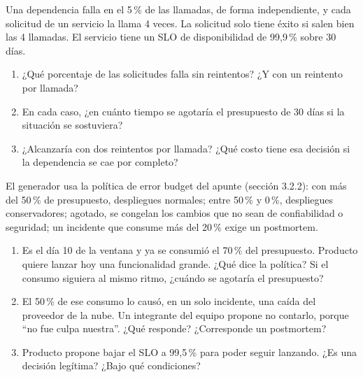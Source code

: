 \documentclass[variant=guia,cover=institutional,mode=screen]{ua-engineering-v6-article}
\begin{document}
\begin{uaexercise}
Una dependencia falla en el 5\,\% de las llamadas, de forma independiente, y cada solicitud de un servicio la llama 4 veces. La solicitud solo tiene éxito si salen bien las 4 llamadas. El servicio tiene un SLO de disponibilidad de 99,9\,\% sobre 30 días.
\begin{enumerate}
\item ¿Qué porcentaje de las solicitudes falla sin reintentos? ¿Y con un reintento por llamada?
\item En cada caso, ¿en cuánto tiempo se agotaría el presupuesto de 30 días si la situación se sostuviera?
\item ¿Alcanzaría con dos reintentos por llamada? ¿Qué costo tiene esa decisión si la dependencia se cae por completo?
\end{enumerate}
\end{uaexercise}

\begin{uaexercise}
El generador usa la política de error budget del apunte (sección 3.2.2): con más del 50\,\% de presupuesto, despliegues normales; entre 50\,\% y 0\,\%, despliegues conservadores; agotado, se congelan los cambios que no sean de confiabilidad o seguridad; un incidente que consume más del 20\,\% exige un postmortem.
\begin{enumerate}
\item Es el día 10 de la ventana y ya se consumió el 70\,\% del presupuesto. Producto quiere lanzar hoy una funcionalidad grande. ¿Qué dice la política? Si el consumo siguiera al mismo ritmo, ¿cuándo se agotaría el presupuesto?
\item El 50\,\% de ese consumo lo causó, en un solo incidente, una caída del proveedor de la nube. Un integrante del equipo propone no contarlo, porque ``no fue culpa nuestra''. ¿Qué responde? ¿Corresponde un postmortem?
\item Producto propone bajar el SLO a 99,5\,\% para poder seguir lanzando. ¿Es una decisión legítima? ¿Bajo qué condiciones?
\end{enumerate}
\end{uaexercise}
\end{document}
